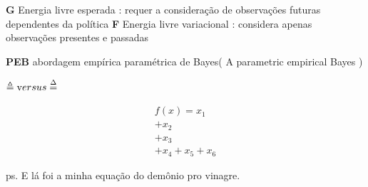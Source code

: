 \documentclass[
  12pt,
]{book}
\begin{document}
\textbf{G} Energia livre esperada : requer a consideração de observações futuras dependentes da política
\textbf{F} Energia livre variacional : considera apenas observações presentes e passadas

\textbf{PEB} abordagem empírica paramétrica de Bayes( A parametric empirical Bayes )

\(\triangleq \text versus \overset{\Delta}{=}\)

\[ \begin{align} f(x) =  x_1  \\+ x_2 \\ + x_3 \\ + x_4 + x_5 + x_6\end{align}\]

ps. E lá foi a minha equação do demônio pro vinagre.

  
\end{document}
